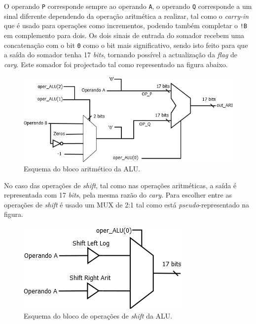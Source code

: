 \documentclass[11pt]{article}
\numberwithin{equation}{section}
\begin{document}
O operando \texttt{P} corresponde sempre ao operando \texttt{A}, o operando \texttt{Q} corresponde a  um sinal diferente dependendo da operação aritmética a realizar, tal como o \textit{carry-in} que é usado para operações como incrementos, podendo também completar o \texttt{!B} em complemento para dois. Os dois sinais de entrada do somador recebem uma concatenação com o bit \texttt{0} como o bit mais significativo, sendo isto feito para que a saída do somador tenha 17 \textit{bits}, tornando possível a actualização da \textit{flag} de \textit{cary}. Este somador foi projectado tal como representado na figura abaixo.

\vspace{1mm}

\begin{figure}[H]
	\centering
	\includegraphics[keepaspectratio=true, scale=0.40]{imagens/Arit}
	\caption{Esquema do bloco aritmético da ALU.}
	\vspace{-0.8em}
\end{figure}

No caso das operações de \textit{shift}, tal como nas operações aritméticas, a saída é representada com 17 \textit{bits}, pela mesma razão do \textit{cary}. Para escolher entre as operações de \textit{shift} é usado um MUX de 2:1 tal como está \textit{pseudo}-representado na figura.

\begin{figure}[H]
	\centering
	\includegraphics[keepaspectratio=true, scale=0.40]{imagens/Shift}
	\caption{Esquema do bloco de operações de \textit{shift} da ALU.}
	\vspace{-0.8em}
\end{figure}
\end{document}
